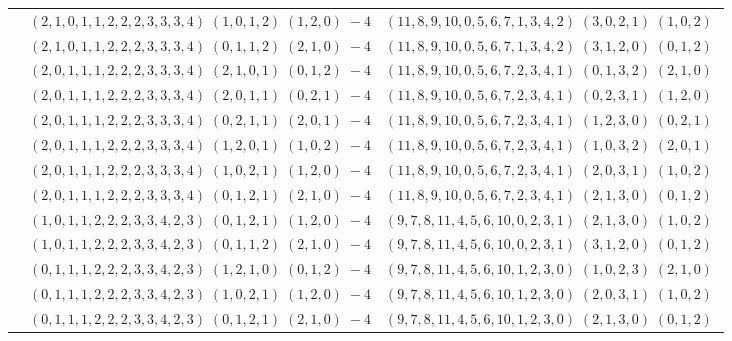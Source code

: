 \documentclass[11pt]{article}
\begin{document}
\begin{longtable}[l]{|c|c|c|}
 \cline{2-3} 
 & $(2 ,1 ,0 ,1 ,1 ,2 ,2 ,2 ,3 ,3 ,3 ,4) \;(1 ,0 ,1 ,2) \;(1 ,2 ,0) \;-4$ & $(11 ,8 ,9 ,10 ,0 ,5 ,6 ,7 ,1 ,3 ,4 ,2) \;(3 ,0 ,2 ,1) \;(1 ,0 ,2) \;$\\ 
 \cline{2-3} 
 & $(2 ,1 ,0 ,1 ,1 ,2 ,2 ,2 ,3 ,3 ,3 ,4) \;(0 ,1 ,1 ,2) \;(2 ,1 ,0) \;-4$ & $(11 ,8 ,9 ,10 ,0 ,5 ,6 ,7 ,1 ,3 ,4 ,2) \;(3 ,1 ,2 ,0) \;(0 ,1 ,2) \;$\\ 
 \cline{2-3} 
 & $(2 ,0 ,1 ,1 ,1 ,2 ,2 ,2 ,3 ,3 ,3 ,4) \;(2 ,1 ,0 ,1) \;(0 ,1 ,2) \;-4$ & $(11 ,8 ,9 ,10 ,0 ,5 ,6 ,7 ,2 ,3 ,4 ,1) \;(0 ,1 ,3 ,2) \;(2 ,1 ,0) \;$\\ 
 \cline{2-3} 
 & $(2 ,0 ,1 ,1 ,1 ,2 ,2 ,2 ,3 ,3 ,3 ,4) \;(2 ,0 ,1 ,1) \;(0 ,2 ,1) \;-4$ & $(11 ,8 ,9 ,10 ,0 ,5 ,6 ,7 ,2 ,3 ,4 ,1) \;(0 ,2 ,3 ,1) \;(1 ,2 ,0) \;$\\ 
 \cline{2-3} 
 & $(2 ,0 ,1 ,1 ,1 ,2 ,2 ,2 ,3 ,3 ,3 ,4) \;(0 ,2 ,1 ,1) \;(2 ,0 ,1) \;-4$ & $(11 ,8 ,9 ,10 ,0 ,5 ,6 ,7 ,2 ,3 ,4 ,1) \;(1 ,2 ,3 ,0) \;(0 ,2 ,1) \;$\\ 
 \cline{2-3} 
 & $(2 ,0 ,1 ,1 ,1 ,2 ,2 ,2 ,3 ,3 ,3 ,4) \;(1 ,2 ,0 ,1) \;(1 ,0 ,2) \;-4$ & $(11 ,8 ,9 ,10 ,0 ,5 ,6 ,7 ,2 ,3 ,4 ,1) \;(1 ,0 ,3 ,2) \;(2 ,0 ,1) \;$\\ 
 \cline{2-3} 
 & $(2 ,0 ,1 ,1 ,1 ,2 ,2 ,2 ,3 ,3 ,3 ,4) \;(1 ,0 ,2 ,1) \;(1 ,2 ,0) \;-4$ & $(11 ,8 ,9 ,10 ,0 ,5 ,6 ,7 ,2 ,3 ,4 ,1) \;(2 ,0 ,3 ,1) \;(1 ,0 ,2) \;$\\ 
 \cline{2-3} 
 & $(2 ,0 ,1 ,1 ,1 ,2 ,2 ,2 ,3 ,3 ,3 ,4) \;(0 ,1 ,2 ,1) \;(2 ,1 ,0) \;-4$ & $(11 ,8 ,9 ,10 ,0 ,5 ,6 ,7 ,2 ,3 ,4 ,1) \;(2 ,1 ,3 ,0) \;(0 ,1 ,2) \;$\\ 
 \cline{2-3} 
 & $(1 ,0 ,1 ,1 ,2 ,2 ,2 ,3 ,3 ,4 ,2 ,3) \;(0 ,1 ,2 ,1) \;(1 ,2 ,0) \;-4$ & $(9 ,7 ,8 ,11 ,4 ,5 ,6 ,10 ,0 ,2 ,3 ,1) \;(2 ,1 ,3 ,0) \;(1 ,0 ,2) \;$\\ 
 \cline{2-3} 
 & $(1 ,0 ,1 ,1 ,2 ,2 ,2 ,3 ,3 ,4 ,2 ,3) \;(0 ,1 ,1 ,2) \;(2 ,1 ,0) \;-4$ & $(9 ,7 ,8 ,11 ,4 ,5 ,6 ,10 ,0 ,2 ,3 ,1) \;(3 ,1 ,2 ,0) \;(0 ,1 ,2) \;$\\ 
 \cline{2-3} 
 & $(0 ,1 ,1 ,1 ,2 ,2 ,2 ,3 ,3 ,4 ,2 ,3) \;(1 ,2 ,1 ,0) \;(0 ,1 ,2) \;-4$ & $(9 ,7 ,8 ,11 ,4 ,5 ,6 ,10 ,1 ,2 ,3 ,0) \;(1 ,0 ,2 ,3) \;(2 ,1 ,0) \;$\\ 
 \cline{2-3} 
 & $(0 ,1 ,1 ,1 ,2 ,2 ,2 ,3 ,3 ,4 ,2 ,3) \;(1 ,0 ,2 ,1) \;(1 ,2 ,0) \;-4$ & $(9 ,7 ,8 ,11 ,4 ,5 ,6 ,10 ,1 ,2 ,3 ,0) \;(2 ,0 ,3 ,1) \;(1 ,0 ,2) \;$\\ 
 \cline{2-3} 
 & $(0 ,1 ,1 ,1 ,2 ,2 ,2 ,3 ,3 ,4 ,2 ,3) \;(0 ,1 ,2 ,1) \;(2 ,1 ,0) \;-4$ & $(9 ,7 ,8 ,11 ,4 ,5 ,6 ,10 ,1 ,2 ,3 ,0) \;(2 ,1 ,3 ,0) \;(0 ,1 ,2) \;$\\ 

\end{longtable}
\end{document}
